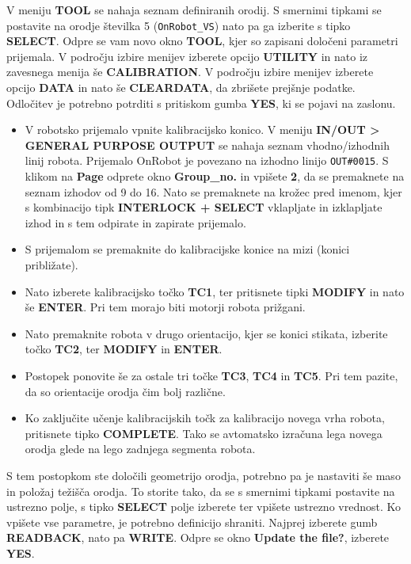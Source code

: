 V meniju \textbf{TOOL} se nahaja seznam definiranih orodij. S smernimi tipkami se postavite na orodje številka 5 (\verb"OnRobot_VS") nato pa ga izberite s tipko \textbf{SELECT}. Odpre se vam novo okno \textbf{TOOL}, kjer so zapisani določeni parametri prijemala. V področju izbire menijev izberete opcijo \textbf{UTILITY} in nato iz zavesnega menija še \textbf{CALIBRATION}. V področju izbire menijev izberete opcijo \textbf{DATA} in nato še \textbf{CLEARDATA}, da zbrišete prejšnje podatke. Odločitev je potrebno potrditi s pritiskom gumba \textbf{YES}, ki se pojavi na zaslonu.

\begin{itemize}
	\item V robotsko prijemalo vpnite kalibracijsko konico. V meniju \textbf{IN/OUT > GENERAL PURPOSE OUTPUT} se nahaja seznam vhodno/izhodnih linij robota. Prijemalo OnRobot je povezano na izhodno linijo \verb"OUT#0015". S klikom na \textbf{Page} odprete okno \textbf{Group\_no.} in vpišete \textbf{2}, da se premaknete na seznam izhodov od 9 do 16. Nato se premaknete na krožec pred imenom, kjer s kombinacijo tipk \textbf{INTERLOCK + SELECT} vklapljate in izklapljate izhod in s tem odpirate in zapirate prijemalo.
	\item S prijemalom se premaknite do kalibracijske konice na mizi (konici približate).
	\item Nato izberete kalibracijsko točko \textbf{TC1}, ter pritisnete tipki \textbf{MODIFY} in nato še \textbf{ENTER}. Pri tem morajo biti motorji robota prižgani.
	\item Nato premaknite robota v drugo orientacijo, kjer se konici stikata, izberite točko \textbf{TC2}, ter \textbf{MODIFY} in \textbf{ENTER}.
	\item Postopek ponovite še za ostale tri točke \textbf{TC3}, \textbf{TC4} in \textbf{TC5}. Pri tem pazite, da so orientacije orodja čim bolj različne.
	\item Ko zaključite učenje kalibracijskih točk za kalibracijo novega vrha robota, pritisnete tipko \textbf{COMPLETE}. Tako se avtomatsko izračuna lega novega orodja glede na lego zadnjega segmenta robota.
\end{itemize}

S tem postopkom ste določili geometrijo orodja, potrebno pa je nastaviti še maso in položaj težišča orodja. To storite tako, da se s smernimi tipkami postavite na ustrezno polje, s tipko \textbf{SELECT} polje izberete ter vpišete ustrezno vrednost. Ko vpišete vse parametre, je potrebno definicijo shraniti. Najprej izberete gumb \textbf{READBACK}, nato pa \textbf{WRITE}. Odpre se okno \textbf{Update the file?}, izberete \textbf{YES}.

